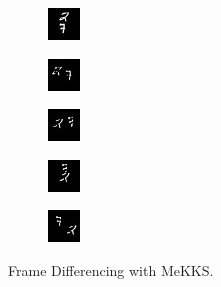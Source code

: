 \begin{subfigure}[t]{0.9\textwidth}
    \centering
    \begin{subfigure}[t]{0.19\textwidth}
        \centering
        \includegraphics[scale=2]{figures/MeKKS-DIFFERENCING/frame0}
    \end{subfigure}
    \hfill
    \begin{subfigure}[t]{0.19\textwidth}
        \centering
        \includegraphics[scale=2]{figures/MeKKS-DIFFERENCING/frame4}
    \end{subfigure}
    \hfill
    \begin{subfigure}[t]{0.19\textwidth}
        \centering
        \includegraphics[scale=2]{figures/MeKKS-DIFFERENCING/frame8}
    \end{subfigure}
    \hfill
    \begin{subfigure}[t]{0.19\textwidth}
        \centering
        \includegraphics[scale=2]{figures/MeKKS-DIFFERENCING/frame12}
    \end{subfigure}
    \hfill
    \begin{subfigure}[t]{0.19\textwidth}
        \centering
        \includegraphics[scale=2]{figures/MeKKS-DIFFERENCING/frame16}
    \end{subfigure}
    \caption{Frame Differencing with MeKKS.}
\end{subfigure}
\\ \bigskip
